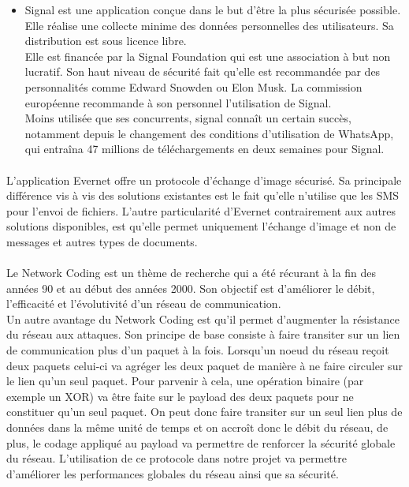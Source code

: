 \begin{itemize}
    \item Signal est une application conçue dans le but d'être la plus sécurisée possible. Elle réalise une collecte minime des données personnelles des utilisateurs. Sa distribution est sous licence libre. 
    \\Elle est financée par la Signal Foundation qui est une association à but non lucratif. Son haut niveau de sécurité fait qu'elle est recommandée par des personnalités comme Edward Snowden ou Elon Musk. La commission européenne recommande à son personnel l'utilisation de Signal. 
    \\Moins utilisée que ses concurrents, signal connaît un certain succès, notamment depuis le changement des conditions d'utilisation de WhatsApp, qui entraîna 47 millions de téléchargements en deux semaines pour Signal.\\
    
\end{itemize}
\paragraph{}L'application Evernet offre un protocole d'échange d'image sécurisé. Sa principale différence vis à vis des solutions existantes est le fait qu'elle n'utilise que les SMS pour l'envoi de fichiers. L'autre particularité d'Evernet contrairement aux autres solutions disponibles, est qu'elle permet uniquement l'échange d'image et non de messages et autres types de documents.

\paragraph{}Le Network Coding est un thème de recherche qui a été récurant à la fin des années 90 et au début des années 2000. Son objectif est d'améliorer le débit, l'efficacité et l'évolutivité d'un réseau de communication. 
\\Un autre avantage du Network Coding est qu'il permet d'augmenter la résistance du réseau aux attaques. Son principe de base consiste à faire transiter sur un lien de communication plus d'un paquet à la fois. Lorsqu'un noeud du réseau reçoit deux paquets celui-ci va agréger les deux paquet de manière à ne faire circuler sur le lien qu'un seul paquet. Pour parvenir à cela, une opération binaire (par exemple un XOR) va être faite sur le payload des deux paquets pour ne constituer qu'un seul paquet. On peut donc faire transiter sur un seul lien plus de données dans la même unité de temps et on accroît donc le débit du réseau, de plus, le codage appliqué au payload va permettre de renforcer la sécurité globale du réseau. L'utilisation de ce protocole dans notre projet va permettre d'améliorer les performances globales du réseau ainsi que sa sécurité.    

